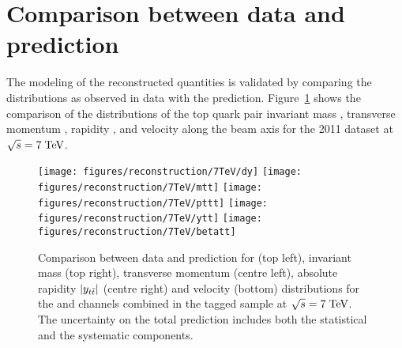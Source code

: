 \section{Comparison between data and prediction}
\label{sec:datamcreco}

The modeling of the reconstructed quantities is validated by comparing
the distributions as observed in data with the prediction. 
Figure~\ref{fig:datamcreco2011} 
shows the comparison of the distributions of
the top quark pair invariant mass \mtt{}, transverse momentum \pttt{},
rapidity \ytt{}, and velocity along the beam axis \betatt{} for the
2011 dataset at $\sqrt{s} = 7 \; \mathrm{TeV}{}$.
                                   
\begin{figure}[!htb]\centering
  \texttt{[image: figures/reconstruction/7TeV/dy]}
  \texttt{[image: figures/reconstruction/7TeV/mtt]}
  \texttt{[image: figures/reconstruction/7TeV/pttt]}
  \texttt{[image: figures/reconstruction/7TeV/ytt]}
  \texttt{[image: figures/reconstruction/7TeV/betatt]}
  \caption{Comparison between data and prediction for \dy{} (top
    left), invariant mass \mtt{} (top right), transverse momentum
    \pttt{} (centre left), absolute rapidity $|y_{t\bar{t}}{}|$ (centre right)
    and velocity \betatt{} (bottom) distributions for the \ejets{} and
    \mujets{} channels combined in the tagged sample at $\sqrt{s} = 7
    \; \mathrm{TeV}{}$. The uncertainty on the total prediction includes both the
    statistical and the systematic components.} 
  \label{fig:datamcreco2011}
\end{figure}


